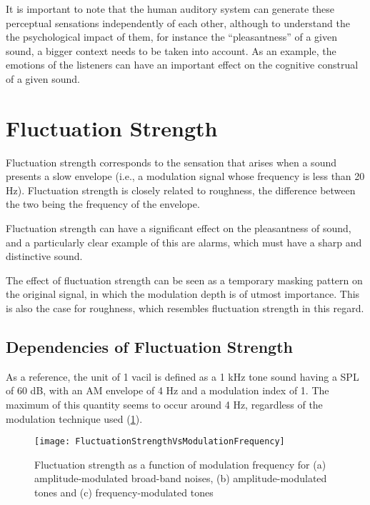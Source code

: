 \documentclass[../main.tex]{subfiles}
\begin{document}
\begin{theoreticalbackground}
It is important to note that the human auditory system can generate these
perceptual sensations independently of each other, although to understand the
the psychological impact of them, for instance the ``pleasantness'' of a given
sound, a bigger context needs to be taken into account. As an example, the
emotions of the listeners can have an important effect on the cognitive
construal of a given sound.

\section{Fluctuation Strength}

Fluctuation strength corresponds to the sensation that arises when a sound
presents a slow envelope (i.e., a modulation signal whose frequency is less than
20 Hz). Fluctuation strength is closely related to roughness, the difference
between the two being the frequency of the envelope.

Fluctuation strength can have a significant effect on the pleasantness of sound,
and a particularly clear example of this are alarms, which must have a sharp and
distinctive sound.

The effect of fluctuation strength can be seen as a temporary masking pattern on
the original signal, in which the modulation depth is of utmost importance. This
is also the case for roughness, which resembles fluctuation strength in this
regard.

\subsection{Dependencies of Fluctuation Strength}

As a reference, the unit of 1 vacil is defined as a 1 kHz tone sound having a
\gls{SPL} of 60 dB, with an \gls{AM} envelope of 4 Hz and a modulation index of
1. The maximum of this quantity seems to occur around 4 Hz, regardless of the
modulation technique used (\cref{fig:flucstrenvmodfreq}).

\begin{figure}
  \centering
  \texttt{[image: FluctuationStrengthVsModulationFrequency]}
  \caption{Fluctuation strength as a function of modulation frequency for (a)
    amplitude-modulated broad-band noises, (b) amplitude-modulated tones and (c)
    frequency-modulated tones~\cite[pp.~248]{Fastl2007Psychoacoustics}}
\label{fig:flucstrenvmodfreq}
\end{figure}


\end{theoreticalbackground}
\end{document}
